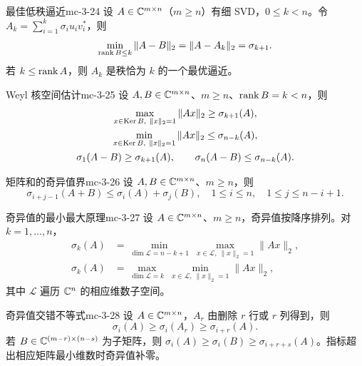 \begin{theorem}{最佳低秩逼近}{mc-3-24}
设 $A\in\mathbb{C}^{m\times n}$（$m\geq n$）有细 SVD，$0\leq k<n$。令 $A_k=\sum_{i=1}^k\sigma_iu_iv_i^*$，则
\[\min_{\operatorname{rank} B\leq k}\|A-B\|_2=\|A-A_k\|_2=\sigma_{k+1}.\]
若 $k\leq\operatorname{rank} A$，则 $A_k$ 是秩恰为 $k$ 的一个最优逼近。
\end{theorem}

\begin{theorem}{Weyl 核空间估计}{mc-3-25}
设 $A,B\in\mathbb{C}^{m\times n}$、$m\geq n$、$\operatorname{rank} B=k<n$，则
\[
\begin{gathered}
\max_{x\in\operatorname{Ker} B,\ \|x\|_2=1}\|Ax\|_2\geq\sigma_{k+1}(A),\\
\min_{x\in\operatorname{Ker} B,\ \|x\|_2=1}\|Ax\|_2\leq\sigma_{n-k}(A),\\
\sigma_1(A-B)\geq\sigma_{k+1}(A),\qquad\sigma_n(A-B)\leq\sigma_{n-k}(A).
\end{gathered}
\]
\end{theorem}

\begin{theorem}{矩阵和的奇异值界}{mc-3-26}
设 $A,B\in\mathbb{C}^{m\times n}$、$m\geq n$，则
\[\sigma_{i+j-1}(A+B)\leq\sigma_i(A)+\sigma_j(B),\quad1\leq i\leq n,\quad1\leq j\leq n-i+1.\]
\end{theorem}

\begin{theorem}{奇异值的最小最大原理}{mc-3-27}
设 $A\in\mathbb{C}^{m\times n}$、$m\geq n$，奇异值按降序排列。对 $k=1,\ldots,n$，
\[
\begin{aligned}
\sigma_k(A)&=\min_{\dim\mathcal L=n-k+1}\ \max_{x\in\mathcal L,\ \|x\|_2=1}\|Ax\|_2,\\
\sigma_k(A)&=\max_{\dim\mathcal L=k}\ \min_{x\in\mathcal L,\ \|x\|_2=1}\|Ax\|_2,
\end{aligned}
\]
其中 $\mathcal L$ 遍历 $\mathbb{C}^n$ 的相应维数子空间。
\end{theorem}

\begin{lemma}{奇异值交错不等式}{mc-3-28}
设 $A\in\mathbb{C}^{m\times n}$，$A_r$ 由删除 $r$ 行或 $r$ 列得到，则
\[\sigma_i(A)\geq\sigma_i(A_r)\geq\sigma_{i+r}(A).\]
若 $B\in\mathbb{C}^{(m-r)\times(n-s)}$ 为子矩阵，则 $\sigma_i(A)\geq\sigma_i(B)\geq\sigma_{i+r+s}(A)$。指标超出相应矩阵最小维数时奇异值补零。
\end{lemma}

